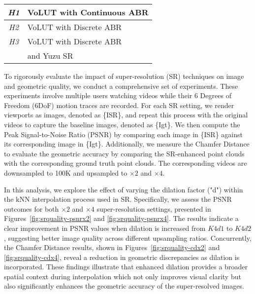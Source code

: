 \begin{figure*}[t]
\begin{minipage}{0.27\textwidth}
        \small
        \begin{tabular}{c|l}
            \textit{H1} & VoLUT with Continuous ABR \\
            \hline
            \textit{H2} & VoLUT with Discrete ABR \\
            \hline
            \textit{H3} & VoLUT with Discrete ABR\\
            & and Yuzu SR
        \end{tabular}
        \label{tab:variants}
    \end{minipage}
\end{figure*}
To rigorously evaluate the impact of super-resolution (SR) techniques on image and geometric quality, we conduct a comprehensive set of experiments. These experiments involve multiple users watching videos while their 6 Degrees of Freedom (6DoF) motion traces are recorded. For each SR setting, we render viewports as images, denoted as \{ISR\}, and repeat this process with the original videos to capture the baseline images, denoted as \{Igt\}. We then compute the Peak Signal-to-Noise Ratio (PSNR) by comparing each image in \{ISR\} against its corresponding image in \{Igt\}. Additionally, we measure the Chamfer Distance to evaluate the geometric accuracy by comparing the SR-enhanced point clouds with the corresponding ground truth point clouds. The corresponding videos are downsampled to 100K and upsampled to $\times2$ and $\times4$.

\label{sec:eval-inter}

In this analysis, we explore the effect of varying the dilation factor ("d") within the kNN interpolation process used in SR. Specifically, we assess the PSNR outcomes for both $\times2$ and $\times4$ super-resolution settings, presented in Figures~\ref{fig:srquality-psnrx2} and \ref{fig:srquality-psnrx4}. The results indicate a clear improvement in PSNR values when dilation is increased from $K4d1$ to $K4d2$, suggesting better image quality across different upsampling ratios. Concurrently, the Chamfer Distance results, shown in Figures~\ref{fig:srquality-cdx2} and \ref{fig:srquality-cdx4}, reveal a reduction in geometric discrepancies as dilation is incorporated. These findings illustrate that enhanced dilation provides a broader spatial context during interpolation which not only improves visual clarity but also significantly enhances the geometric accuracy of the super-resolved images.

